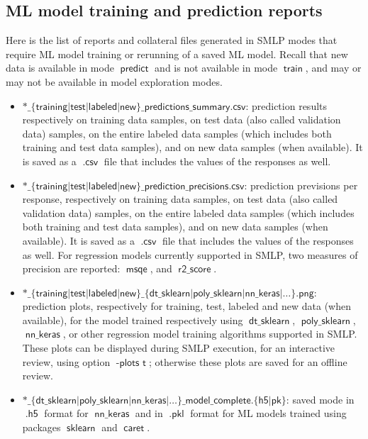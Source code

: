 \documentclass[a4paper,parskip=half]{article} %
\newcommand*\option[1]{\operatorname{\mathsf{#1}}} %
\newcommand*\suffix[1]{\operatorname{\mathsf{#1}}} %
\newcommand*\mode[1]{\operatorname{\mathsf{#1}}} %
\newcommand*\package[1]{\operatorname{\mathsf{#1}}} %
\newcommand*\precision[1]{\operatorname{\mathsf{#1}}} %
\newcommand*\model[1]{\operatorname{\mathsf{#1}}} %
\begin{document}
\subsection{ML model training and prediction reports}\label{sec:models:reports}


Here is the list of reports and collateral files generated in SMLP modes that require ML model training or rerunning 
of a saved ML model. Recall that new data is available in mode $\mode{predict}$ and is not available in mode 
$\mode{train}$, and may or may not be available in model exploration modes.

\begin{itemize}
\item $\suffix{*\_\{training|test|labeled|new\}\_predictions\_summary.csv}$: prediction results respectively on 
training data samples, on test data (also called validation data) samples, on the entire labeled data samples
(which includes both training and test data samples), and on new data samples (when available). It is saved as 
a $\suffix{.csv}$ file that includes the values of the responses as well.
\item $\suffix{*\_\{training|test|labeled|new\}\_prediction\_precisions.csv}$: prediction previsions per response, 
respectively on training data samples, on test data (also called validation data) samples, on the entire labeled data 
samples (which includes both training and test data samples), and on new data samples (when available). It is saved 
as a $\suffix{.csv}$ file that includes the values of the responses as well. For regression models currently supported 
in SMLP, two measures of precision are reported: $\precision{msqe}$, and $\precision{r2\_score}$.
\item $\suffix{*\_\{training|test|labeled|new\}\_\{dt\_sklearn|poly\_sklearn|nn\_keras|\ldots\}.png}$: prediction plots,
respectively for training, test, labeled and new data (when available), for the model trained respectively using 
$\model{dt\_sklearn}$, $\model{poly\_sklearn}$, $\model{nn\_keras}$, 
or other regression model training algorithms supported in SMLP. These plots can be displayed during SMLP
execution, for an interactive review, using option $\option{-plots\,\,t}$; otherwise these plots are saved
for an offline review. 
\item $\suffix{*\_\{dt\_sklearn|poly\_sklearn|nn\_keras|\ldots\}\_model\_complete.\{h5|pk\}}$: saved mode
in $\suffix{.h5}$ format for $\model{nn\_keras}$ and in  $\suffix{.pkl}$ format for ML models trained 
using packages $\package{sklearn}$ and $\package{caret}$.

\end{itemize}
\end{document}
